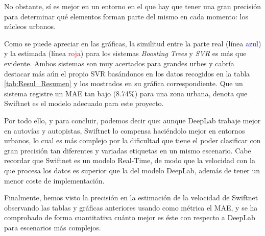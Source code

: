 No obstante, sí es mejor en un entorno en el que hay que tener una gran precisión para determinar qué elementos forman parte del mismo en cada momento: los núcleos urbanos.

Como se puede apreciar en las gráficas, la similitud entre la parte real (línea \textcolor{blue}{azul}) y la estimada (línea \textcolor{red}{roja}) para los sistemas \textit{Boosting Trees} y \textit{\ac{SVR}} es más que evidente. Ambos sistemas son muy acertados para grandes urbes y cabría destacar más aún el propio \ac{SVR} basándonos en los datos recogidos en la tabla \ref{tab:Resul_Resumen} y los mostrados en su gráfica correspondiente. Que un sistema registre un \ac{MAE} tan bajo (8.74\%) para una zona urbana, denota que Swiftnet es el modelo adecuado para este proyecto.



Por todo ello, y para concluir, podemos decir que: aunque DeepLab trabaje mejor en autovías y autopistas, Swiftnet lo compensa haciéndolo mejor en entornos urbanos, lo cual es más complejo por la dificultad que tiene el poder clasificar con gran precisión tan diferentes y variadas etiquetas en un mismo escenario. Cabe recordar que Swiftnet es un modelo Real-Time, de modo que la velocidad con la que procesa los datos es superior que la del modelo DeepLab, además de tener un menor coste de implementación.

Finalmente, hemos visto la precisión en la estimación de la velocidad de Swiftnet observando las tablas y gráficas anteriores usando como métrica el \ac{MAE}, y se ha comprobado de forma cuantitativa cuánto mejor es éste con respecto a DeepLab para escenarios más complejos.
